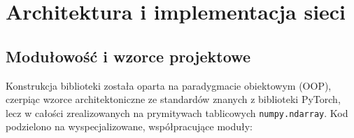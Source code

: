 \documentclass[11pt,a4paper]{article}
\begin{document}
\section{Architektura i implementacja sieci}

\subsection{Modułowość i wzorce projektowe}
Konstrukcja biblioteki została oparta na paradygmacie obiektowym (OOP), czerpiąc wzorce architektoniczne ze standardów znanych z biblioteki PyTorch, lecz w całości zrealizowanych na prymitywach tablicowych \texttt{numpy.ndarray}. Kod podzielono na wyspecjalizowane, współpracujące moduły:
\end{document}

